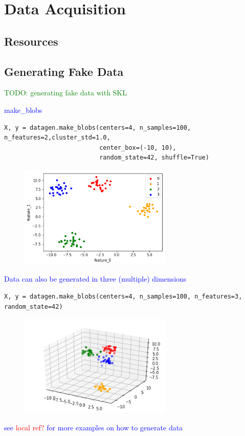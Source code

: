 \section{Data Acquisition}


\subsection{Resources}

\subsection{Generating Fake Data}

\textcolor{green}{TODO: generating fake data with SKL}

\textcolor{blue}{make\_blobs}

\begin{lstlisting}[style=pyInStyle]
X, y = datagen.make_blobs(centers=4, n_samples=100, n_features=2,cluster_std=1.0,
                          center_box=(-10, 10),
                          random_state=42, shuffle=True)
\end{lstlisting}

\begin{figure}
\centering
\includegraphics[width=0.65\textwidth]{./sync_imgs/datagen/blobs/2dimg.png}
\label{fig:datagen_blobs_2dimg}
\end{figure}

\textcolor{blue}{Data can also be generated in three (multiple) dimensions}

\begin{lstlisting}[style=pyInStyle]
X, y = datagen.make_blobs(centers=4, n_samples=100, n_features=3, random_state=42)
\end{lstlisting}

\begin{figure}
\centering
\includegraphics[width=0.65\textwidth]{./sync_imgs/datagen/blobs/3dimg.png}
\label{fig:datagen_blobs_3dimg}
\end{figure}


\textcolor{blue}{see \textcolor{red}{local ref?} for more examples on how to generate data}
